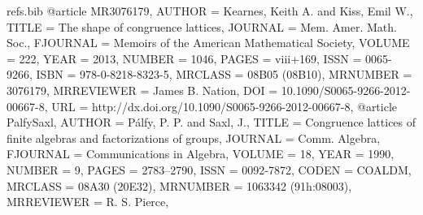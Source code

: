 \begin{filecontents*}{refs.bib}
@article {MR3076179,
    AUTHOR = {Kearnes, Keith A. and Kiss, Emil W.},
     TITLE = {The shape of congruence lattices},
   JOURNAL = {Mem. Amer. Math. Soc.},
  FJOURNAL = {Memoirs of the American Mathematical Society},
    VOLUME = {222},
      YEAR = {2013},
    NUMBER = {1046},
     PAGES = {viii+169},
      ISSN = {0065-9266},
      ISBN = {978-0-8218-8323-5},
   MRCLASS = {08B05 (08B10)},
  MRNUMBER = {3076179},
MRREVIEWER = {James B. Nation},
       DOI = {10.1090/S0065-9266-2012-00667-8},
       URL = {http://dx.doi.org/10.1090/S0065-9266-2012-00667-8},
}
@article {PalfySaxl,
    AUTHOR = {P{\'a}lfy, P. P. and Saxl, J.},
     TITLE = {Congruence lattices of finite algebras and factorizations of
              groups},
   JOURNAL = {Comm. Algebra},
  FJOURNAL = {Communications in Algebra},
    VOLUME = {18},
      YEAR = {1990},
    NUMBER = {9},
     PAGES = {2783--2790},
      ISSN = {0092-7872},
     CODEN = {COALDM},
   MRCLASS = {08A30 (20E32)},
  MRNUMBER = {1063342 (91h:08003)},
MRREVIEWER = {R. S. Pierce},
}
\end{filecontents*}

\documentclass{amsart}
\usepackage[style = ieee, urldate = comp]{biblatex}
%
%
\usepackage{amsmath}%
\usepackage{amsfonts}%
\usepackage{amssymb}%
\usepackage{mathrsfs}
\usepackage{stmaryrd,enumerate}
\usepackage{graphicx}
\usepackage{comment}
\usepackage{tikz}
\usepackage{xspace}
\usepackage[smaller]{acronym}%

